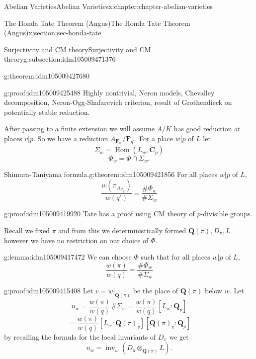 \documentclass[oneside,10pt,]{book}
\numberwithin{equation}{section}
\newcommand{\QQ}{\mathbf{Q}}
\newcommand{\CC}{\mathbf{C}}
\newcommand{\FF}{\mathbf{F}}
\DeclareMathOperator{\Hom}{Hom}
\begin{document}
\begin{chapterptx}{Abelian Varieties}{}{Abelian Varieties}{}{}{x:chapter:chapter-abelian-varieties}
\begin{sectionptx}{The Honda Tate Theorem (Angus)}{}{The Honda Tate Theorem (Angus)}{}{}{x:section:sec-honda-tate}
\begin{subsectionptx}{Surjectivity and CM theory}{}{Surjectivity and CM theory}{}{}{g:subsection:idm105009471376}
\begin{theorem}{}{}{g:theorem:idm105009427680}
\end{theorem}
\begin{proofptx}{}{g:proof:idm105009425488}
Highly nontrivial, Neron models, Chevalley decomposition, Neron-Ogg-Shafarevich criterion, result of Grothendieck on potentially stable reduction.%
\end{proofptx}
After passing to a finite extension we will assume \(A/K\) has good reduction at places \(v|p\). So we have a reduction \(A_{\FF_{q'}}/\FF_{q'}\). For a place \(w|p\) of \(L\) let%
\begin{equation*}
\Sigma_w = \Hom(L_w, \CC_p)
\end{equation*}
%
\begin{equation*}
\Phi_w = \Phi \cap \Sigma_w\text{.}
\end{equation*}
%
\begin{theorem}{Shimura-Taniyama formula.}{}{g:theorem:idm105009421856}%
For all places \(w|p\) of \(L\),%
\begin{equation*}
\frac{w(\pi_{A_{\FF_{q'}}})}{w(q')} = \frac{\#\Phi_w}{\#\Sigma_w}
\end{equation*}
%
\end{theorem}
\begin{proofptx}{}{g:proof:idm105009419920}
Tate has a proof using CM theory of \(p\)-divisible groups.%
\end{proofptx}
Recall we fixed \(\pi\) and from this we deterministically formed \(\QQ(\pi), D_{\pi}, L\) however we have no restriction on our choice of \(\Phi\).%
\begin{lemma}{}{}{g:lemma:idm105009417472}%
We can choose \(\Phi\) such that for all places \(w|p\) of \(L\),%
\begin{equation*}
\frac{w(\pi)}{w(q)} = \frac{\#\Phi_w}{\#\Sigma_w}
\end{equation*}
%
\end{lemma}
\begin{proofptx}{}{g:proof:idm105009415408}
Let \(v = w|_{\QQ(\pi)}\) be the place of \(\QQ(\pi)\) below \(w\). Let%
\begin{equation*}
n_w = \frac{w(\pi)}{w(q)}\#\Sigma_w = \frac{w(\pi)}{w(q)}[L_w :\QQ_p]
\end{equation*}
%
\begin{equation*}
= \frac{w(\pi)}{w(q)}[L_w :\QQ(\pi)_v ][ \QQ(\pi)_v:\QQ_p]
\end{equation*}
by recalling the formula for the local invariants of \(D_\pi\) we get%
\begin{equation*}
n_w = \operatorname{inv}_w(D_\pi\otimes_{\QQ(\pi)} L)\text{.}

\end{equation*}
\end{proofptx}
\end{subsectionptx}
\end{sectionptx}
\end{chapterptx}
\end{document}
